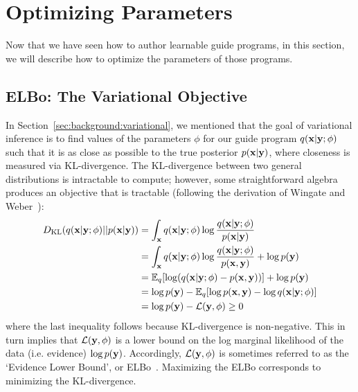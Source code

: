 \section{Optimizing Parameters}
\label{sec:optimization}

Now that we have seen how to author learnable guide programs, in this section, we will describe how to optimize the parameters of those programs. 

\subsection{ELBo: The Variational Objective}

In Section~\ref{sec:background:variational}, we mentioned that the goal of variational inference is to find values of the parameters $\phi$ for our guide program $q(\mathbf{x} | \mathbf{y} ; \phi)$ such that it is as close as possible to the true posterior $p(\mathbf{x} | \mathbf{y})$, where closeness is measured via KL-divergence. The KL-divergence between two general distributions is intractable to compute; however, some straightforward algebra produces an objective that is tractable (following the derivation of Wingate and Weber~\cite{AVIPP}):
\begin{align}
\begin{split}
D_{\text{KL}}(q(\mathbf{x} | \mathbf{y} ; \phi) || p(\mathbf{x} | \mathbf{y}))
&= \int_{\mathbf{x}} q(\mathbf{x} | \mathbf{y} ; \phi) \log \frac{q(\mathbf{x} | \mathbf{y} ; \phi)}{p(\mathbf{x} | \mathbf{y})}\\
&= \int_{\mathbf{x}} q(\mathbf{x} | \mathbf{y} ; \phi) \log \frac{q(\mathbf{x} | \mathbf{y} ; \phi)}{p(\mathbf{x}, \mathbf{y})} + \log p(\mathbf{y})\\
&= \mathbb{E}_{q}[ \log(q(\mathbf{x} | \mathbf{y} ; \phi) -  p(\mathbf{x}, \mathbf{y}) ) ] + \log p(\mathbf{y})\\
&= \log p(\mathbf{y}) - \mathbb{E}_{q}[ \log p(\mathbf{x}, \mathbf{y}) - \log q(\mathbf{x} | \mathbf{y} ; \phi) ]\\
&= \log p(\mathbf{y}) - \mathcal{L}(\mathbf{y}, \phi) \geq 0
\end{split}
\label{eq:elbo}
\end{align}
where the last inequality follows because KL-divergence is non-negative. This in turn implies that $\mathcal{L}(\mathbf{y}, \phi)$ is a lower bound on the log marginal likelihood of the data (i.e. evidence) $\log p(\mathbf{y})$. Accordingly, $\mathcal{L}(\mathbf{y}, \phi)$ is sometimes referred to as the `Evidence Lower Bound', or ELBo~\cite{BBVI}. Maximizing the ELBo corresponds to minimizing the KL-divergence.

